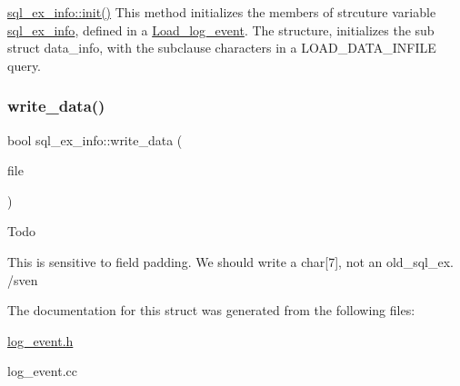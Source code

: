 \mbox{\hyperlink{structsql__ex__info_afc2ad48f8753d51dd01acd841eecce43}{sql\+\_\+ex\+\_\+info\+::init()}} This method initializes the members of strcuture variable \mbox{\hyperlink{structsql__ex__info}{sql\+\_\+ex\+\_\+info}}, defined in a \mbox{\hyperlink{classLoad__log__event}{Load\+\_\+log\+\_\+event}}. The structure, initializes the sub struct data\+\_\+info, with the subclause characters in a L\+O\+A\+D\+\_\+\+D\+A\+T\+A\+\_\+\+I\+N\+F\+I\+LE query. \mbox{\label{structsql__ex__info_a90e3b19d97cb512779dd0bf6112d4fd0}} 
\subsubsection{\texorpdfstring{write\+\_\+data()}{write\_data()}}
{\footnotesize\ttfamily bool sql\+\_\+ex\+\_\+info\+::write\+\_\+data (\begin{DoxyParamCaption}\item[{I\+O\+\_\+\+C\+A\+C\+HE $\ast$}]{file }\end{DoxyParamCaption})}

\begin{DoxyRefDesc}{Todo}
\item[\mbox{\hyperlink{todo__todo000047}{Todo}}]This is sensitive to field padding. We should write a char\mbox{[}7\mbox{]}, not an old\+\_\+sql\+\_\+ex. /sven \end{DoxyRefDesc}


The documentation for this struct was generated from the following files\+:\begin{DoxyCompactItemize}
\item 
\mbox{\hyperlink{log__event_8h}{log\+\_\+event.\+h}}\item 
log\+\_\+event.\+cc\end{DoxyCompactItemize}
